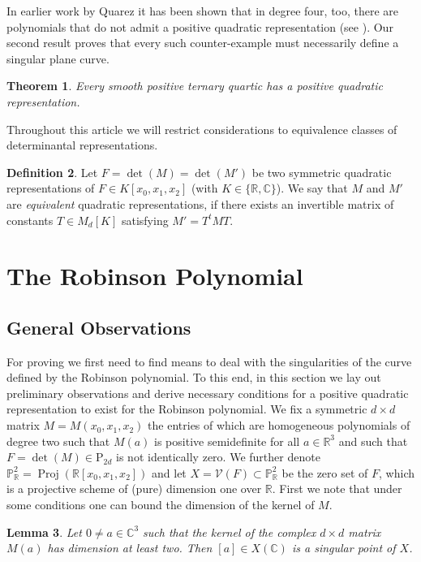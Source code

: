\documentclass[a4paper,10pt]{amsart}
\theoremstyle{definition}
\newtheorem{Def}{Definition}[section]
\theoremstyle{plain}
\newtheorem{thm}[Def]{Theorem}
\newtheorem{lem}[Def]{Lemma}
\newcommand{\Proj}{\operatorname{Proj}}
\newcommand{\cV}{{\mathcal V}}
\newcommand{\C}{{\mathbb C}}
\newcommand{\R}{{\mathbb R}}
\newcommand{\pp}{\mathbb{P}}
\begin{document}
In earlier work by Quarez it has been shown that in degree four, too, there are polynomials that do not admit a positive quadratic representation (see \cite[\S 7]{quarez}). Our second result proves that every such counter-example must necessarily define a singular plane curve.
\begin{thm}\label{thm:quart}
 Every smooth positive ternary quartic has a positive quadratic representation. 
\end{thm}

Throughout this article we will restrict considerations to equivalence classes of determinantal representations.

\begin{Def}
    Let $F = \det(M) = \det(M')$ be two symmetric quadratic representations of $F \in K[x_0, x_1, x_2]$ (with $K \in \{\R, \C\}$). We say that $M$ and $M'$ are \emph{equivalent} quadratic representations, if there exists an invertible matrix of constants $T \in M_d[K]$ satisfying $M' = T^tMT$.
\end{Def}


\section{The Robinson Polynomial}

\subsection{General Observations}

For proving  we first need to find means to deal with the singularities of the curve defined by the Robinson polynomial. To this end, in this section we lay out preliminary observations and derive necessary conditions for a positive quadratic representation to exist for the Robinson polynomial. We fix a symmetric $d\times d$ matrix $M=M(x_0,x_1,x_2)$ the entries of which  are homogeneous polynomials of degree two such that $M(a)$ is positive semidefinite for all $a\in\R^3$ and such that $F=\det(M)\in\textrm{P}_{2d}$ is not identically zero. We further denote $\pp^2_\R=\Proj(\R[x_0,x_1,x_2])$ and let $X=\cV(F)\subset\pp^2_\R$ be the zero set of $F$, which is a projective scheme of (pure) dimension one over $\R$. First we note that under some conditions one can bound the dimension of the kernel of $M$.

\begin{lem}\label{lem:kersing}
 Let $0\neq a\in\C^3$ such that the kernel of the complex $d\times d$ matrix $M(a)$ has dimension at least two. Then $[a]\in X(\C)$ is a singular point of $X$.
\end{lem}
\end{document}
